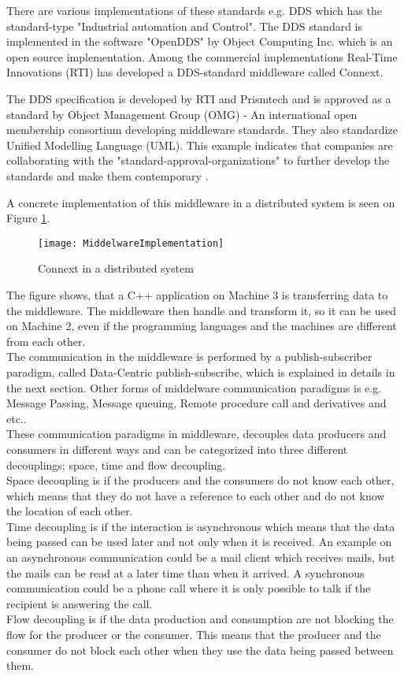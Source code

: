 \documentclass[Main]{subfiles}
\begin{document}
There are various implementations of these standards e.g. DDS which has the standard-type "Industrial automation and Control". 
The DDS standard is implemented in the software "OpenDDS" by Object Computing Inc. which is an open source implementation. 
Among the commercial implementations Real-Time Innovations (RTI) has developed a DDS-standard middleware called Connext.


The DDS specification is developed by RTI and Prismtech and is approved as a standard by Object Management Group (OMG) - An international open membership consortium developing middleware standards. They also standardize Unified Modelling Language (UML).
This example indicates that companies are collaborating with the "standard-approval-organizations" to further develop the standards and make them contemporary \cite{DDS-slides}.

A concrete implementation of this middleware in a distributed system is seen on Figure \ref{fig:impl}.

\begin{figure}[H]
\centering
\texttt{[image: MiddelwareImplementation]}
\caption{Connext in a distributed system}
\label{fig:impl}
\end{figure}

The figure shows, that a C++ application on Machine 3 is transferring data to the middleware. The middleware then handle and transform it, so it can be used on Machine 2, even if the programming languages and the machines are different from each other. 
\\
The communication in the middleware is performed by a publish-subscriber paradigm, called Data-Centric publish-subscribe, which is explained in details in the next section. Other forms of middelware communication paradigms is e.g. Message Passing, Message queuing, Remote procedure call and derivatives and etc.\cite{DDS-slides}.
\\
These communication paradigms in middleware, decouples data producers and consumers in different ways and can be categorized into three different decouplings; space, time and flow decoupling.
\\
Space decoupling is if the producers and the consumers do not know each other, which means that they do not have a reference to each other and do not know the location of each other.
\\
Time decoupling is if the interaction is asynchronous which means that the data being passed can be used later and not only when it is received. 
An example on an asynchronous communication could be a mail client which receives mails, but the mails can be read at a later time than when it arrived. 
A synchronous communication could be a phone call where it is only possible to talk if the recipient is answering the call. 
\\
Flow decoupling is if the data production and consumption are not blocking the flow for the producer or the consumer. 
This means that the producer and the consumer do not block each other when they use the data being passed between them.
\end{document}
